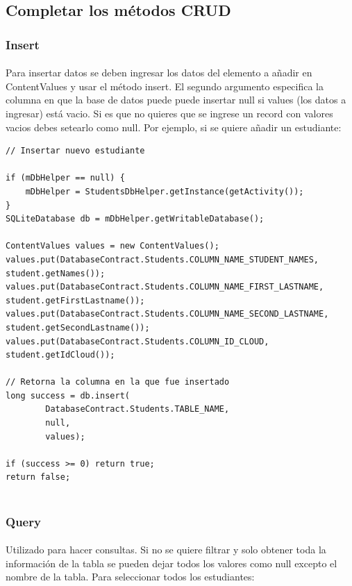 \documentclass[10pt]{extarticle}
\begin{document}
\subsection{Completar los métodos CRUD}

\subsubsection{Insert}
\paragraph{}
Para insertar datos se deben ingresar los datos del elemento a añadir en ContentValues y usar el método insert. El segundo argumento especifica la columna en que la base de datos puede puede insertar null si values (los datos a ingresar) está vacio. Si es que no quieres que se ingrese un record con valores vacios debes setearlo como null. Por ejemplo, si se quiere añadir un estudiante:
	
\begin{lstlisting}
// Insertar nuevo estudiante

if (mDbHelper == null) {
    mDbHelper = StudentsDbHelper.getInstance(getActivity());
}
SQLiteDatabase db = mDbHelper.getWritableDatabase();

ContentValues values = new ContentValues();
values.put(DatabaseContract.Students.COLUMN_NAME_STUDENT_NAMES, student.getNames());
values.put(DatabaseContract.Students.COLUMN_NAME_FIRST_LASTNAME, student.getFirstLastname());
values.put(DatabaseContract.Students.COLUMN_NAME_SECOND_LASTNAME, student.getSecondLastname());
values.put(DatabaseContract.Students.COLUMN_ID_CLOUD, student.getIdCloud());

// Retorna la columna en la que fue insertado
long success = db.insert(
        DatabaseContract.Students.TABLE_NAME, 
        null,								  
        values);
        
if (success >= 0) return true;
return false;
     
\end{lstlisting}

\subsubsection{Query}
\paragraph{}
Utilizado para hacer consultas. Si no se quiere filtrar y solo obtener toda la información de la tabla se pueden dejar todos los valores como null excepto el nombre de la tabla. Para seleccionar todos los estudiantes:
\end{document}
